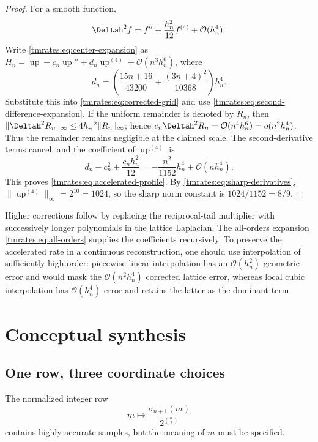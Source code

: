 \documentclass[11pt,oneside]{article}
\theoremstyle{definition}
\theoremstyle{remark}
\newcommand{\Up}{\operatorname{up}}
\newcommand{\bigO}{\mathcal O}
\newcommand{\smallo}{o}
\begin{document}
\begin{proof}
For a smooth function,
\begin{equation}
 \Deltah^2f=f''+\frac{h_n^2}{12}f^{(4)}+\bigO(h_n^4).      \label{tmrates:eq:second-difference-expansion}
\end{equation}
Write \eqref{tmrates:eq:center-expansion} as
$H_n=\Up-c_n\Up''+d_n\Up^{(4)}+\bigO(n^3h_n^6)$, where
\[
 d_n=\left(\frac{15n+16}{43200}
          +\frac{(3n+4)^2}{10368}\right)h_n^4.
\]
Substitute this into \eqref{tmrates:eq:corrected-grid} and use
\eqref{tmrates:eq:second-difference-expansion}.  If the uniform remainder is denoted by $R_n$, then
$\|\Deltah^2R_n\|_\infty\le4h_n^{-2}\|R_n\|_\infty$; hence
$c_n\Deltah^2R_n=\bigO(n^4h_n^6)=\smallo(n^2h_n^4)$.  Thus the remainder remains negligible
at the claimed scale.  The second-derivative terms cancel, and the coefficient of
$\Up^{(4)}$ is
\begin{equation*}
 d_n-c_n^2+\frac{c_nh_n^2}{12}
 =-\frac{n^2}{1152}h_n^4+\bigO(nh_n^4).
\end{equation*}
This proves \eqref{tmrates:eq:accelerated-profile}.  By \eqref{tmrates:eq:sharp-derivatives},
$\|\Up^{(4)}\|_\infty=2^{10}=1024$, so the sharp norm constant is
$1024/1152=8/9$.
\end{proof}

Higher corrections follow by replacing the reciprocal-tail multiplier with successively
longer polynomials in the lattice Laplacian.  The all-orders expansion
\eqref{tmrates:eq:all-orders} supplies the coefficients recursively.  To preserve the accelerated
rate in a continuous reconstruction, one should use interpolation of sufficiently high order:
piecewise-linear interpolation has an $\bigO(h_n^2)$ geometric error and would mask the
$\bigO(n^2h_n^4)$ corrected lattice error, whereas local cubic interpolation has
$\bigO(h_n^4)$ error and retains the latter as the dominant term.

\section{Conceptual synthesis}
\label{tmrates:sec:synthesis}

\subsection{One row, three coordinate choices}

The normalized integer row
\begin{equation}
 m\longmapsto\frac{\sigma_{n+1}(m)}{2^{\binom n2}}        \label{tmrates:eq:one-row}
\end{equation}
contains highly accurate samples, but the meaning of $m$ must be specified.
\end{document}
